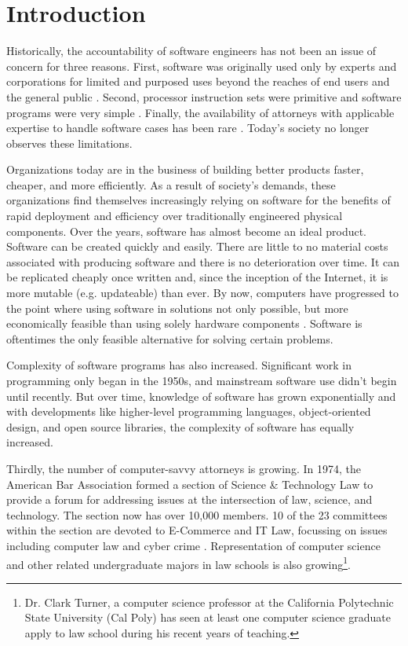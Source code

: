 \chapter{Introduction}

Historically, the accountability of software engineers has not been an issue of
concern for three reasons. First, software was originally used only by experts
and corporations for limited and purposed uses beyond the reaches of end
users and the general public \cite{Leveson95}. Second, processor instruction 
sets were primitive and software programs were very simple \cite{Storey95}. 
Finally, the availability of attorneys with applicable expertise to handle 
software cases has been rare \cite{Armour93}. Today's society no longer observes
these limitations.

Organizations today are in the business of building better products faster,
cheaper, and more efficiently. As a result of society's demands, these
organizations find themselves increasingly relying on software for the benefits
of rapid deployment and efficiency over traditionally engineered physical
components. Over the years, software has almost become an ideal product.
Software can be created quickly and easily. There are little to no material
costs associated with producing software and there is no deterioration over
time. It can be replicated cheaply once written and, since the inception of the
Internet, it is more mutable (e.g. updateable) than ever. By now, computers
have progressed to the point where using software in solutions not only
possible, but more economically feasible than using solely hardware components 
\cite{Baase97}. Software is oftentimes the only feasible alternative for solving
certain problems.

Complexity of software programs has also increased. Significant work in
programming only began in the 1950s, and mainstream software use didn't begin
until recently. But over time, knowledge of software has grown exponentially
and with developments like higher-level programming languages, object-oriented
design, and open source libraries, the complexity of software has equally
increased.

Thirdly, the number of computer-savvy attorneys is growing. In 1974, the
American Bar Association formed a section of Science \& Technology Law to provide
a forum for addressing issues at the intersection of law, science, and
technology. The section now has over 10,000 members. 10 of the 23 committees
within the section are devoted to E-Commerce and IT Law, focussing on issues
including computer law and cyber crime \cite{SCITECH}. Representation of
computer science and other related undergraduate majors in law schools is also
growing\footnote{Dr. Clark Turner, a computer science professor at the
California Polytechnic State University (Cal Poly) has seen at least one
computer science graduate apply to law school during his recent years of
teaching.}.

